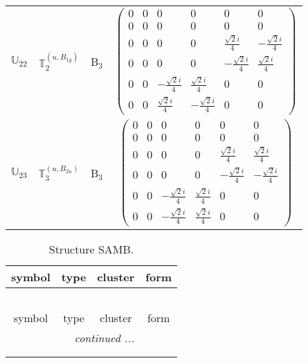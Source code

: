 \documentclass[fleqn,10pt,landscape]{article}
\begin{document}
\begin{itemize}
\begin{center}
\begin{longtable}{c|c|c|c}
$ \mathbb{U}_{22} $ & $\mathbb{T}_{2}^{(u,B_{1g})}$ & B$_{3}$ & $\begin{pmatrix} 0 & 0 & 0 & 0 & 0 & 0 \\ 0 & 0 & 0 & 0 & 0 & 0 \\ 0 & 0 & 0 & 0 & \frac{\sqrt{2} i}{4} & - \frac{\sqrt{2} i}{4} \\ 0 & 0 & 0 & 0 & - \frac{\sqrt{2} i}{4} & \frac{\sqrt{2} i}{4} \\ 0 & 0 & - \frac{\sqrt{2} i}{4} & \frac{\sqrt{2} i}{4} & 0 & 0 \\ 0 & 0 & \frac{\sqrt{2} i}{4} & - \frac{\sqrt{2} i}{4} & 0 & 0 \end{pmatrix}$ \\
$ \mathbb{U}_{23} $ & $\mathbb{T}_{3}^{(u,B_{2u})}$ & B$_{3}$ & $\begin{pmatrix} 0 & 0 & 0 & 0 & 0 & 0 \\ 0 & 0 & 0 & 0 & 0 & 0 \\ 0 & 0 & 0 & 0 & \frac{\sqrt{2} i}{4} & \frac{\sqrt{2} i}{4} \\ 0 & 0 & 0 & 0 & - \frac{\sqrt{2} i}{4} & - \frac{\sqrt{2} i}{4} \\ 0 & 0 & - \frac{\sqrt{2} i}{4} & \frac{\sqrt{2} i}{4} & 0 & 0 \\ 0 & 0 & - \frac{\sqrt{2} i}{4} & \frac{\sqrt{2} i}{4} & 0 & 0 \end{pmatrix}$ \\
\end{longtable}
\end{center}
\begin{center}
\renewcommand{\arraystretch}{1.3}
\begin{longtable}{c|c|c|c}
\caption{Structure SAMB.}
 \\
 \hline \hline
symbol & type & cluster & form \\ \hline \endfirsthead

\multicolumn{3}{l}{\tablename\ \thetable{}} \\
 \hline \hline
symbol & type & cluster & form \\ \hline \endhead

 \hline \hline
\multicolumn{3}{r}{\footnotesize\it continued ...} \\ \endfoot

 \hline \hline
\multicolumn{3}{r}{} \\ \endlastfoot


\end{longtable}
\end{center}
\end{itemize}
\end{document}
